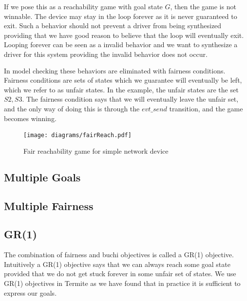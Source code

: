 If we pose this as a reachability game with goal state $G$, then the game is not winnable. The device may stay in the loop forever as it is never guaranteed to exit. Such a behavior should not prevent a driver from being synthesized providing that we have good reason to believe that the loop will eventually exit. Looping forever can be seen as a invalid behavior and we want to synthesize a driver for this system providing the invalid behavior does not occur. 

In model checking these behaviors are eliminated with fairness conditions. Fairness conditions are sets of states which we guarantee will eventually be left, which we refer to as unfair states. In the example, the unfair states are the set ${S2, S3}$. The fairness condition says that we will eventually leave the unfair set, and the only way of doing this is through the $evt\_send$ transition, and the game becomes winning.

\begin{figure}[t]
\centering
\texttt{[image: diagrams/fairReach.pdf]}
\caption{Fair reachability game for simple network device}
\label{fig:fair}
\end{figure}

\subsection{Multiple Goals}

\subsection{Multiple Fairness}

\subsection{GR(1)}

The combination of fairness and buchi objectives is called a GR(1) objective. Intuitively a GR(1) objective says that we can always reach some goal state provided that we do not get stuck forever in some unfair set of states. We use GR(1) objectives in Termite as we have found that in practice it is sufficient to express our goals.

